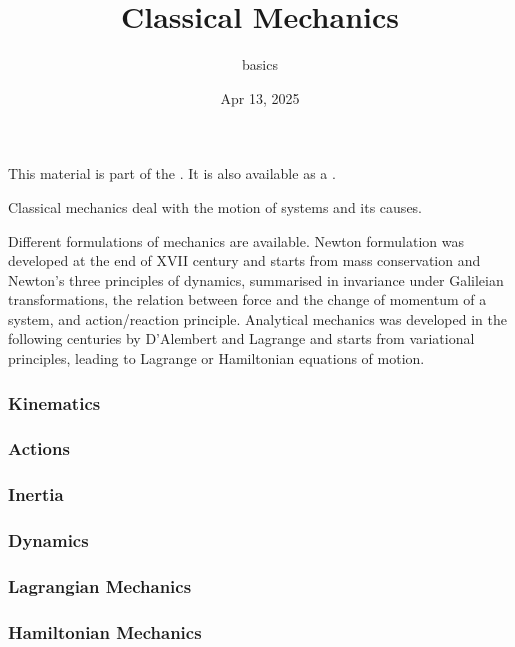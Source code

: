 \documentclass[letterpaper,10pt,english]{jupyterBook}
\title{Classical Mechanics}
\date{Apr 13, 2025}
\author{basics}
\begin{document}
\pagestyle{empty}
\sphinxmaketitle
\pagestyle{plain}
\sphinxtableofcontents
\pagestyle{normal}
\label{\detokenize{intro::doc}}


\sphinxAtStartPar
This material is part of the . It is also available as a .

\sphinxAtStartPar
Classical mechanics deal with the motion of systems and its causes.

\sphinxAtStartPar
Different formulations of mechanics are available. Newton formulation was developed at the end of XVII century and starts from mass conservation and Newton’s three principles of dynamics, summarised in invariance under Galileian transformations, the relation between force and the change of momentum of a system, and action/reaction principle. Analytical mechanics was developed in the following centuries by D’Alembert and Lagrange and starts from variational principles, leading to Lagrange or Hamiltonian equations of motion.

\sphinxAtStartPar
{}
\subsubsection*{Kinematics}
\subsubsection*{Actions}
\subsubsection*{Inertia}
\subsubsection*{Dynamics}

\sphinxAtStartPar
{}
\subsubsection*{Lagrangian Mechanics}
\subsubsection*{Hamiltonian Mechanics}
\end{document}
